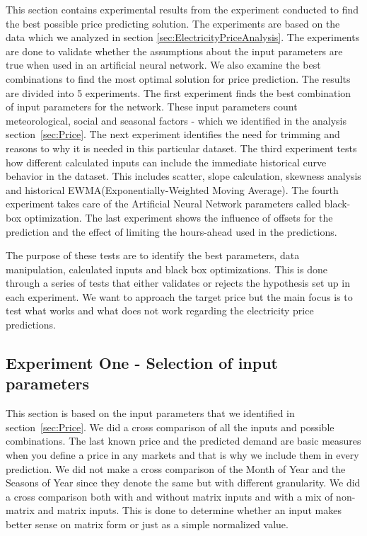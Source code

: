 This section contains experimental results from the experiment conducted to find the best possible price predicting solution. The experiments are based on the data which we analyzed in section \ref{sec:ElectricityPriceAnalysis}. The experiments are done to validate whether the assumptions about the input parameters are true when used in an artificial neural network. We also examine the best combinations to find the most optimal solution for price prediction. The results are divided into 5 experiments. The first experiment finds the best combination of input parameters for the network. These input parameters count meteorological, social and seasonal factors - which we identified in the analysis section~\ref{sec:Price}. The next experiment identifies the need for trimming and reasons to why it is needed in this particular dataset. The third experiment tests how different calculated inputs can include the immediate historical curve behavior in the dataset. This includes scatter, slope calculation, skewness analysis and historical EWMA(Exponentially-Weighted Moving Average). The fourth experiment takes care of the Artificial Neural Network parameters called black-box optimization. The last experiment shows the influence of offsets for the prediction and the effect of limiting the hours-ahead used in the predictions.

The purpose of these tests are to identify the best parameters, data manipulation, calculated inputs and black box optimizations. This is done through a series of tests that either validates or rejects the hypothesis set up in each experiment. We want to approach the target price but the main focus is to test what works and what does not work regarding the electricity price predictions.

\subsection{Experiment One - Selection of input parameters}
\label{sec:priceExperimentOne}
This section is based on the input parameters that we identified in section~\ref{sec:Price}. We did a cross comparison of all the inputs and possible combinations. The last known price and the predicted demand are basic measures when you define a price in any markets and that is why we include them in every prediction. We did not make a cross comparison of the Month of Year and the Seasons of Year since they denote the same but with different granularity. We did a cross comparison both with and without matrix inputs and with a mix of non-matrix and matrix inputs. This is done to determine whether an input makes better sense on matrix form or just as a simple normalized value. 

